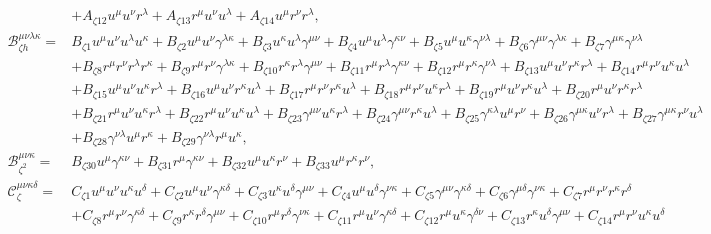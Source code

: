 \documentclass[10pt,twocolumn,preprintnumbers,amsmath,amssymb,nofootinbib
,superscriptaddress]{revtex4-1}
\begin{document}
{\begin{widetext}
\begin{align}
& + A_{\zeta12} u^\mu u^\nu r^\lambda+A_{\zeta13} r^\mu u^\nu u^\lambda +A_{\zeta14}u^\mu r^\nu r^\lambda,\\
 \mathcal{B}_{\zeta h}^{\mu\nu\lambda\kappa}=&B_{\zeta1}u^\mu u^\nu u^\lambda u^\kappa +B_{\zeta2}u^\mu u^\nu\gamma^{\lambda\kappa}+B_{\zeta3}u^\kappa u^\lambda \gamma^{\mu\nu}+B_{\zeta4}u^\mu u^\lambda\gamma^{\kappa\nu}+B_{\zeta5}u^\mu u^\kappa\gamma^{\nu\lambda}+B_{\zeta6}\gamma^{\mu\nu}\gamma^{\lambda\kappa} +B_{\zeta7}\gamma^{\mu\kappa}\gamma^{\nu\lambda}\nonumber\\
 &+B_{\zeta8}r^\mu r^\nu r^\lambda r^\kappa +B_{\zeta9}r^\mu r^\nu\gamma^{\lambda\kappa}+B_{\zeta10}r^\kappa r^\lambda \gamma^{\mu\nu}+B_{\zeta11}r^\mu r^\lambda\gamma^{\kappa\nu}+B_{\zeta12}r^\mu r^\kappa\gamma^{\nu\lambda}+B_{\zeta13}u^\mu u^\nu r^\kappa r^\lambda +B_{\zeta14}r^\mu r^\nu u^\kappa u^\lambda\nonumber \\
 &+B_{\zeta15}u^\mu u^\nu u^\kappa r^\lambda +B_{\zeta16}u^\mu u^\nu r^\kappa u^\lambda +B_{\zeta17} r^\mu r^\nu r^\kappa u^\lambda +B_{\zeta18} r^\mu r^\nu u^\kappa r^\lambda+B_{\zeta19}r^\mu u^\nu r^\kappa u^\lambda+B_{\zeta20}r^\mu u^\nu r^\kappa r^\lambda \nonumber\\
 &+B_{\zeta21}r^\mu u^\nu u^\kappa r^\lambda +B_{\zeta22}r^\mu u^\nu u^\kappa u^\lambda+B_{\zeta23}\gamma^{\mu\nu}u^\kappa r^\lambda+B_{\zeta24}\gamma^{\mu\nu}r^\kappa u^\lambda+B_{\zeta25}\gamma^{\kappa\lambda}u^\mu r^\nu +B_{\zeta26}\gamma^{\mu\kappa}u^\nu r^\lambda+B_{\zeta27}\gamma^{\mu\kappa}r^\nu u^\lambda\nonumber\\
 &+B_{\zeta28}\gamma^{\nu\lambda}u^\mu r^\kappa+B_{\zeta29}\gamma^{\nu\lambda}r^\mu u^\kappa,\\
 \mathcal{B}_{\zeta^2}^{\mu\nu\kappa}=&B_{\zeta30}u^\mu \gamma^{\kappa\nu} +B_{\zeta31}r^\mu \gamma^{\kappa\nu} +B_{\zeta32}u^\mu u^\kappa r^\nu +B_{\zeta33}u^\mu r^\kappa r^\nu,\\
 \mathcal{C}_{\zeta}^{\mu\nu\kappa\delta}=&C_{\zeta1}u^\mu u^\nu u^\kappa u^\delta +C_{\zeta2}u^\mu u^\nu \gamma^{\kappa\delta} +C_{\zeta3}u^\kappa u^\delta\gamma^{\mu\nu} +C_{\zeta4}u^\mu u^\delta\gamma^{\nu\kappa}+C_{\zeta5}\gamma^{\mu\nu}\gamma^{\kappa\delta}+C_{\zeta6}\gamma^{\mu\delta}\gamma^{\nu\kappa}+C_{\zeta7}r^\mu r^\nu r^\kappa r^\delta\nonumber\\
 & +C_{\zeta8}r^\mu r^\nu \gamma^{\kappa\delta} +C_{\zeta9}r^\kappa r^\delta\gamma^{\mu\nu} +C_{\zeta10}r^\mu r^\delta\gamma^{\nu\kappa}+C_{\zeta11}r^\mu u^\nu \gamma^{\kappa\delta} +C_{\zeta12}r^\mu u^\kappa \gamma^{\delta\nu} + C_{\zeta13}r^\kappa u^\delta \gamma^{\mu\nu} + C_{\zeta14} r^\mu r^\nu u^\kappa u^\delta \nonumber\\

\end{align}
\end{widetext}}
\end{document}
